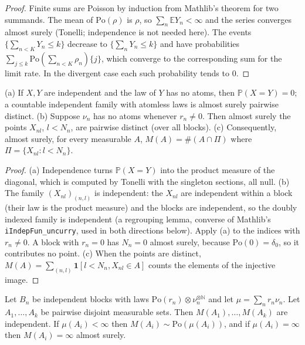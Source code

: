 \begin{proof}
  \leanok
Finite sums are Poisson by induction from Mathlib's theorem for two summands. The mean of $\mathrm{Po}(\rho)$ is $\rho$, so $\sum_n\mathbb E Y_n<\infty$ and the series converges almost surely (Tonelli; independence is not needed here). The events $\{\sum_{n<K}Y_n\le k\}$ decrease to $\{\sum_nY_n\le k\}$ and have probabilities $\sum_{j\le k}\mathrm{Po}(\sum_{n<K}\rho_n)\{j\}$, which converge to the corresponding sum for the limit rate. In the divergent case each such probability tends to $0$.
\end{proof}

\begin{lemma}\label{lem:sg:poisson-distinct}
  \leanok
(a) If $X,Y$ are independent and the law of $Y$ has no atoms, then $\mathbb P(X=Y)=0$; a countable independent family with atomless laws is almost surely pairwise distinct.
(b) Suppose $\nu_n$ has no atoms whenever $r_n\ne0$. Then almost surely the points $X_{nl}$, $l<N_n$, are pairwise distinct (over all blocks).
(c) Consequently, almost surely, for every measurable $A$, $M(A)=\#(A\cap\Pi)$ where $\Pi=\{X_{nl}:l<N_n\}$.
\end{lemma}

\begin{proof}
  \leanok
(a) Independence turns $\mathbb P(X=Y)$ into the product measure of the diagonal, which is computed by Tonelli with the singleton sections, all null. (b) The family $(X_{nl})_{(n,l)}$ is independent: the $X_{nl}$ are independent within a block (their law is the product measure) and the blocks are independent, so the doubly indexed family is independent (a regrouping lemma, converse of Mathlib's \texttt{iIndepFun\_uncurry}, used in both directions below). Apply (a) to the indices with $r_n\ne0$. A block with $r_n=0$ has $N_n=0$ almost surely, because $\mathrm{Po}(0)=\delta_0$, so it contributes no point. (c) When the points are distinct, $M(A)=\sum_{(n,l)}\mathbf 1[l<N_n,X_{nl}\in A]$ counts the elements of the injective image.
\end{proof}

\begin{theorem}\label{thm:sg:poisson-existence}
  \leanok
Let $B_n$ be independent blocks with laws $\mathrm{Po}(r_n)\otimes\nu_n^{\otimes\mathbb N}$ and let $\mu=\sum_nr_n\nu_n$. Let $A_1,\dots,A_k$ be pairwise disjoint measurable sets. Then $M(A_1),\dots,M(A_k)$ are independent. If $\mu(A_i)<\infty$ then $M(A_i)\sim\mathrm{Po}(\mu(A_i))$, and if $\mu(A_i)=\infty$ then $M(A_i)=\infty$ almost surely.
\end{theorem}

